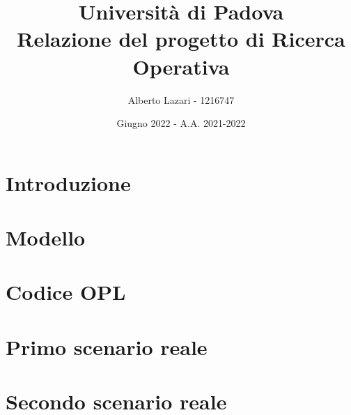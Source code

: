 \documentclass[12pt, a4paper]{article}
\title{\textbf{Università di Padova \\ Relazione del progetto di Ricerca Operativa}}
\author{Alberto Lazari - 1216747}
\date{Giugno 2022 - A.A. 2021-2022}
\begin{document}
	\maketitle
	\pagebreak

	\tableofcontents
	\pagebreak

	\section{Introduzione}
	

	\section{Modello}
	

	\section{Codice OPL}
	

	\section{Primo scenario reale}
	

	\section{Secondo scenario reale}
	
\end{document}
